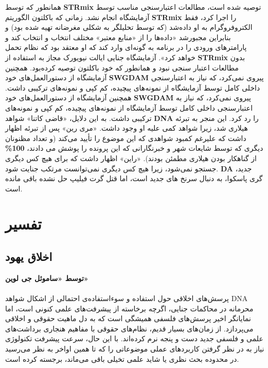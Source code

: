 همانطور که توسط \textenglish{\textbf{STRmix}} توصیه شده است، مطالعات اعتبارسنجی مناسب توسط آزمایشگاه انجام نشد.
زمانی که باکلتون الگوریتم \textenglish{\textbf{STRmix}} را اجرا کرد، فقط الکتروفروگرام به او داده‌شد (که توسط تحلیلگر به شکلی مغرضانه تهیه شده بود) و بنابراین مجبور‌شد «داده‌ها را از «منابع معتبر» مختلف انتخاب و انتخاب کند و پارامترهای ورودی را در برنامه به گونه‌ای وارد کند که او معتقد بود که نظام تحمل خواهد کرد».
آزمایشگاه جنایی ایالت نیویورک مجاز به استفاده از \textenglish{\textbf{STRmix}} بدون مطالعات اعتبار سنجی نبود و همانطور که خود باکلتون توصیه کرده‌بود.
همچنین آزمایشگاه از دستورالعمل‌های خود \textenglish{\textbf{SWGDAM}} پیروی نمی‌کرد، که نیاز به اعتبارسنجی داخلی کامل توسط آزمایشگاه از نمونه‌های پیچیده، کم کپی و نمونه‌های ترکیبی داشت.
همچنین آزمایشگاه از دستورالعمل‌های خود \textenglish{\textbf{SWGDAM}} پیروی نمی‌کرد، که نیاز به اعتبارسنجی داخلی کامل توسط آزمایشگاه از نمونه‌های پیچیده، کم کپی و نمونه‌های ترکیبی داشت.
به این دلایل، «قاضی کاتنا» شواهد \textenglish{\textbf{DNA}} را رد کرد.
این منجر به تبرئه هیلاری شد، زیرا شواهد کمی علیه او وجود داشت.
«مری رین» پس از تبرئه اظهار داشت که علیرغم کمبود شواهدی که این موضوع را تأیید می‌کند (و تعداد مظنونان دیگری که توسط شایعات شهر و خبرنگارانی که این پرونده را پوشش می دادند، \textenglish{\textbf{100\%}} از گناهکار بودن هیلاری مطمئن بودند).
«راین» اظهار داشت که برای هیچ کس دیگری جستجو نمی‌شود، زیرا هیچ کس دیگری نمی‌توانست مرتکب جنایت شود.
\textenglish{\textbf{DA}} جدید، گری پاسکوا، به دنبال سرنخ های جدید است، اما قتل گرت فیلیپ حل نشده باقی مانده است.
\newline
\newline


{
\section*{تفسیر}
\label{sec:تفسیر}

\subsection*{اخلاق یهود}
\label{subsec:اخلاق یهود}
\textbf{توسط «ساموئل جی لوین»}
\\\\
پرسش‌های اخلاقی حول استفاده و سوء‌استفاده‌ی احتمالی از اشکال شواهد DNA محرمانه در محاکمات جنایی، اگرچه برخاسته از پیشرفت‌های علمی کنونی است، اما نمایانگر اخیر پرسش‌های فلسفی همیشگی است که به دل ماهیت حقوقی و اخلاقی می‌پردازد.
از زمان‌های بسیار قدیم، نظام‌های حقوقی با مفاهیم هنجاری برداشت‌های علمی و فلسفی جدید دست و پنجه نرم کرده‌اند.
با این حال، سرعت پیشرفت تکنولوژی نیاز به در نظر گرفتن کاربردهای عملی موضوعاتی را که تا همین اواخر به نظر می‌رسید در محدوده بحث نظری یا شاید علمی تخیلی باقی می‌ماند، برجسته کرده است.
}

